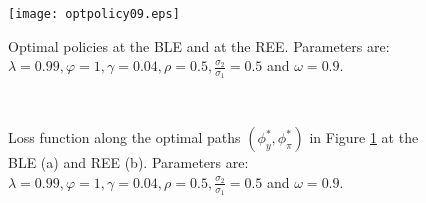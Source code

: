 \begin{figure}
    \begin{center}
     \texttt{[image: optpolicy09.eps]}
     \end{center}
   \caption{\label{opt09} Optimal policies at the BLE and at the REE. Parameters are: $\lambda=0.99, \varphi=1, \gamma=0.04, \rho=0.5, \frac{\sigma_2}{\sigma_1}=0.5$ and $\omega=0.9$.}
    \end{figure}
    
    \begin{figure}
    \begin{center}
        \mbox{\quad
        }
   \end{center}
   \caption{\label{varopt09} Loss function along the optimal paths $(\phi_y^*, \phi_\pi^*)$ in Figure \ref{opt09} at the BLE (a) and REE (b). Parameters are: $\lambda=0.99, \varphi=1, \gamma=0.04,\rho=0.5, \frac{\sigma_2}{\sigma_1}=0.5$ and $\omega=0.9$.}
    \end{figure}
    
